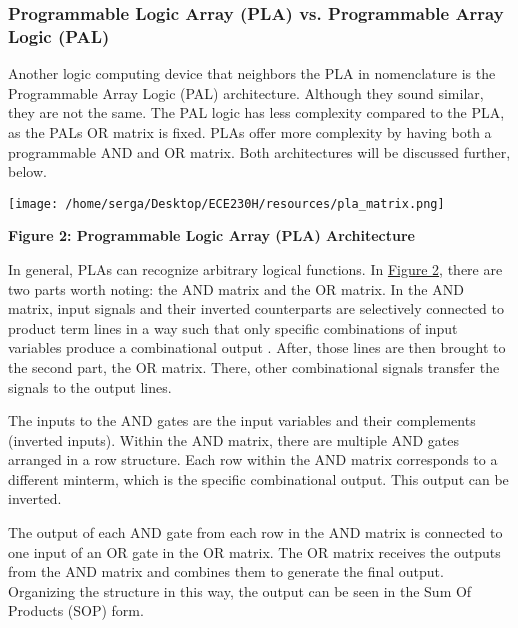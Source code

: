 \documentclass[12pt]{article}
\begin{document}
        \subsubsection{Programmable Logic Array (PLA) vs. Programmable Array Logic (PAL)}

        Another logic computing device that neighbors the PLA in nomenclature
        is the Programmable Array Logic (PAL) architecture. Although they sound 
        similar, they are not the same. The PAL logic has less complexity compared 
        to the PLA, as the PALs OR matrix is fixed. PLAs offer more complexity by 
        having both a programmable AND and OR matrix. Both architectures will be 
        discussed further, below.
        
        \begin{center}
            \vspace{1cm}

            \texttt{[image: /home/serga/Desktop/ECE230H/resources/pla\_matrix.png]}
            
            \vspace{0.5cm}

            \textbf{Figure 2: Programmable Logic Array (PLA) Architecture} \autocite[609]{1675428}
            \label{pla_matrix}
        
        \end{center}

        In general, PLAs can recognize arbitrary logical functions. In 
        \hyperref[pla_matrix]{Figure 2}, there are two parts worth noting: the AND
        matrix and the OR matrix. In the AND matrix, input signals and their 
        inverted counterparts are selectively connected to product term lines in a 
        way such that only specific combinations of input variables produce a 
        combinational output \autocite[609]{1675428}. After, those lines are then
        brought to the second part, the OR matrix. There, other combinational 
        signals transfer the signals to the output lines.

        The inputs to the AND gates are the input variables and their complements 
        (inverted inputs). Within the AND matrix, there are multiple AND gates 
        arranged in a row structure. Each row within the AND matrix corresponds to 
        a different minterm, which is the specific combinational output. This 
        output can be inverted. 

        The output of each AND gate from each row in the AND matrix is connected
        to one input of an OR gate in the OR matrix. The OR matrix receives the
        outputs from the AND matrix and combines them to generate the final output.
        Organizing the structure in this way, the output can be seen in the Sum Of 
        Products (SOP) form.
\end{document}
